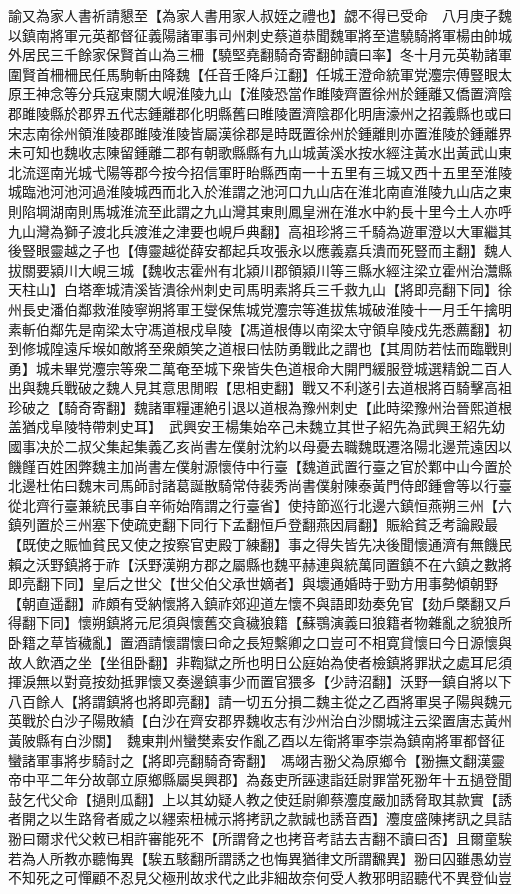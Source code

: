 諭又為家人書祈請懇至【為家人書用家人叔姪之禮也】勰不得已受命　八月庚子魏以鎮南將軍元英都督征義陽諸軍事司州刺史蔡道恭聞魏軍將至遣驍騎將軍楊由帥城外居民三千餘家保賢首山為三柵【驍堅堯翻騎奇寄翻帥讀曰率】冬十月元英勒諸軍圍賢首柵柵民任馬駒斬由降魏【任音壬降戶江翻】任城王澄命統軍党灋宗傅豎眼太原王神念等分兵寇東關大峴淮陵九山【淮陵恐當作雎陵齊置徐州於鍾離又僑置濟陰郡雎陵縣於郡界五代志鍾離郡化明縣舊曰睢陵置濟陰郡化明唐濠州之招義縣也或曰宋志南徐州領淮陵郡雎陵淮陵皆屬漢徐郡是時既置徐州於鍾離則亦置淮陵於鍾離界未可知也魏收志陳留鍾離二郡有朝歌縣縣有九山城黃溪水按水經注黃水出黃武山東北流逕南光城弋陽等郡今按今招信軍盱眙縣西南一十五里有三城又西十五里至淮陵城臨池河池河過淮陵城西而北入於淮謂之池河口九山店在淮北南直淮陵九山店之東則陷堈湖南則馬城淮流至此謂之九山灣其東則鳳皇洲在淮水中約長十里今土人亦呼九山灣為獅子渡北兵渡淮之津要也峴戶典翻】高祖珍將三千騎為遊軍澄以大軍繼其後豎眼靈越之子也【傳靈越從薛安都起兵攻張永以應義嘉兵潰而死豎而主翻】魏人拔關要潁川大峴三城【魏收志霍州有北潁川郡領潁川等三縣水經注梁立霍州治灊縣天柱山】白塔牽城清溪皆潰徐州刺史司馬明素將兵三千救九山【將即亮翻下同】徐州長史潘伯鄰救淮陵寧朔將軍王燮保焦城党灋宗等進拔焦城破淮陵十一月壬午擒明素斬伯鄰先是南梁太守馮道根戍阜陵【馮道根傳以南梁太守領阜陵戍先悉薦翻】初到修城隍遠斥堠如敵將至衆頗笑之道根曰怯防勇戰此之謂也【其周防若怯而臨戰則勇】城未畢党灋宗等衆二萬奄至城下衆皆失色道根命大開門緩服登城選精銳二百人出與魏兵戰破之魏人見其意思閒暇【思相吏翻】戰又不利遂引去道根將百騎擊高祖珍破之【騎奇寄翻】魏諸軍糧運絶引退以道根為豫州刺史【此時梁豫州治晉熙道根盖猶戍阜陵特帶刺史耳】　武興安王楊集始卒己未魏立其世子紹先為武興王紹先幼國事决於二叔父集起集義乙亥尚書左僕射沈約以母憂去職魏既遷洛陽北邊荒遠因以饑饉百姓困弊魏主加尚書左僕射源懷侍中行臺【魏道武置行臺之官於鄴中山今置於北邊杜佑曰魏末司馬師討諸葛誕散騎常侍裴秀尚書僕射陳泰黃門侍郎鍾會等以行臺從北齊行臺兼統民事自辛術始隋謂之行臺省】使持節巡行北邊六鎮恒燕朔三州【六鎮列置於三州塞下使疏吏翻下同行下孟翻恒戶登翻燕因肩翻】賑給貧乏考論殿最【既使之賑恤貧民又使之按察官吏殿丁練翻】事之得失皆先决後聞懷通濟有無饑民賴之沃野鎮將于祚【沃野漢朔方郡之屬縣也魏平赫連與統萬同置鎮不在六鎮之數將即亮翻下同】皇后之世父【世父伯父承世嫡者】與壞通婚時于勁方用事勢傾朝野【朝直遥翻】祚頗有受納懷將入鎮祚郊迎道左懷不與語即劾奏免官【劾戶槩翻又戶得翻下同】懷朔鎮將元尼須與懷舊交貪穢狼籍【蘇鶚演義曰狼籍者物雜亂之貌狼所卧籍之草皆穢亂】置酒請懷謂懷曰命之長短繫卿之口豈可不相寛貸懷曰今日源懷與故人飲酒之坐【坐徂卧翻】非鞫獄之所也明日公庭始為使者檢鎮將罪狀之處耳尼須揮淚無以對竟按劾抵罪懷又奏邊鎮事少而置官猥多【少詩沼翻】沃野一鎮自將以下八百餘人【將謂鎮將也將即亮翻】請一切五分損二魏主從之乙酉將軍吳子陽與魏元英戰於白沙子陽敗績【白沙在齊安郡界魏收志有沙州治白沙關城注云梁置唐志黃州黃陂縣有白沙關】　魏東荆州蠻樊素安作亂乙酉以左衛將軍李崇為鎮南將軍都督征蠻諸軍事將步騎討之【將即亮翻騎奇寄翻】　馮翊吉翂父為原鄉令【翂撫文翻漢靈帝中平二年分故鄣立原鄉縣屬吳興郡】為姦吏所誣逮詣廷尉罪當死翂年十五撾登聞鼔乞代父命【撾則瓜翻】上以其幼疑人教之使廷尉卿蔡灋度嚴加誘脅取其款實【誘者開之以生路脅者威之以纆索杻械示將拷訊之款誠也誘音酉】灋度盛陳拷訊之具詰翂曰爾求代父敕已相許審能死不【所謂脅之也拷音考詰去吉翻不讀曰否】且爾童騃若為人所教亦聽悔異【騃五駭翻所謂誘之也悔異猶律文所謂飜異】翂曰囚雖愚幼豈不知死之可憚顧不忍見父極刑故求代之此非細故奈何受人教邪明詔聽代不異登仙豈